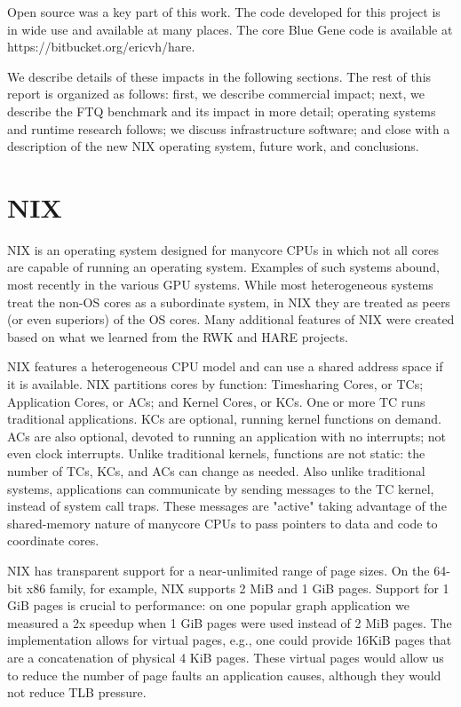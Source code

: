\documentclass{report}
\begin{document}
Open source was a key part of this work. The code developed for this project 
is in wide use and available at many places. The core Blue Gene code is 
available at https://bitbucket.org/ericvh/hare. 

We describe details of these impacts in the following sections. The rest of this 
report is organized as follows: first, we describe commercial impact; next, 
we describe the FTQ benchmark and its impact in more detail; operating systems
and runtime research follows; we discuss infrastructure software; and close with a 
description of the new NIX  operating system, future work, and conclusions. 






\chapter{NIX}

NIX is an operating system designed for manycore CPUs in which not 
all cores are capable of running an operating system. Examples of such 
systems abound, most recently in the various GPU systems. While most 
heterogeneous systems treat the non-OS cores as a subordinate system, 
in NIX they are treated as peers (or even superiors) of the 
OS cores. 
Many  additional features of NIX were created based on what we learned from 
the RWK and HARE projects. 

NIX
features a heterogeneous CPU model and can use a shared address space
if it is available. 
NIX partitions cores by function: Timesharing Cores, or
TCs; Application Cores, or ACs; and Kernel Cores, or KCs.  One or more
TC runs traditional applications.  KCs are optional, running kernel
functions on demand.  ACs are also optional, devoted to running an
application with no interrupts; not even clock interrupts.  Unlike
traditional kernels, functions are not static: the number of TCs, KCs,
and ACs can change as needed.  Also unlike traditional
systems, applications can communicate by sending messages to the TC
kernel, instead of system call traps.  These messages are "active"
taking advantage of the shared-memory nature of manycore CPUs to pass
pointers to data and code to coordinate cores.

NIX has transparent support for a near-unlimited range of page sizes. 
On the 64-bit x86 family, for example, NIX supports 2 MiB and 1 GiB pages. 
Support for 1 GiB pages is crucial to performance: on one popular 
graph application we measured a 2x speedup when 1 GiB pages were used 
instead of 2 MiB pages. 
The implementation allows for virtual pages, e.g., one could 
provide 16KiB pages that are a concatenation of physical 4 KiB pages. 
These virtual pages would allow us to reduce the number of page 
faults an application causes, although they would not reduce 
TLB pressure. 
\end{document}

